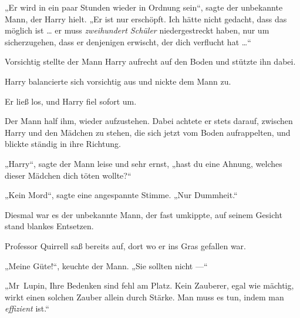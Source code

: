 „Er wird in ein paar Stunden wieder in Ordnung sein“, sagte der unbekannte Mann, der Harry hielt.
„Er ist nur erschöpft. Ich hätte nicht gedacht, dass das möglich ist … er muss \emph{zweihundert Schüler} niedergestreckt haben, nur um sicherzugehen, dass er denjenigen erwischt, der dich verflucht hat …“

Vorsichtig stellte der Mann Harry aufrecht auf den Boden und stützte ihn dabei.

Harry balancierte sich vorsichtig aus und nickte dem Mann zu.

Er ließ los, und Harry fiel sofort um.

Der Mann half ihm, wieder aufzustehen. Dabei achtete er stets darauf, zwischen Harry und den Mädchen zu stehen, die sich jetzt vom Boden aufrappelten, und blickte ständig in ihre Richtung.

„Harry“, sagte der Mann leise und sehr ernst, „hast du eine Ahnung, welches dieser Mädchen dich töten wollte?“

„Kein Mord“, sagte eine angespannte Stimme.
„Nur Dummheit.“

Diesmal war es der unbekannte Mann, der fast umkippte, auf seinem Gesicht stand blankes Entsetzen.

Professor Quirrell saß bereits auf, dort wo er ins Gras gefallen war.

„Meine Güte!“, keuchte der Mann.
„Sie sollten nicht —“

„Mr~Lupin, Ihre Bedenken sind fehl am Platz. Kein Zauberer, egal wie mächtig, wirkt einen solchen Zauber allein durch Stärke. Man muss es tun, indem man \emph{effizient} ist.“

